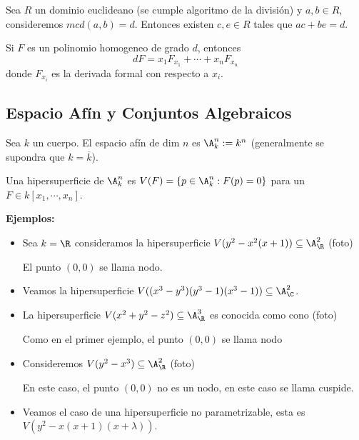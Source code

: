 \documentclass{article}
\begin{document}
\begin{teo}
    Sea $R$ un dominio euclideano (se cumple algoritmo de la división) y $a,b\in R$, consideremos
    $mcd(a,b)=d$. Entonces existen $c,e\in R$ tales que $ac+be=d$.
\end{teo}

\begin{teo}
    Si $F$ es un polinomio homogeneo de grado $d$, entonces
    \begin{equation*}
        dF=x_{1}F_{x_{1}}+\cdots+x_{n}F_{x_{n}}
    \end{equation*}
    donde $F_{x_{i}}$ es la derivada formal con respecto a $x_{i}$.
\end{teo}

\subsection{Espacio Afín y Conjuntos Algebraicos}
\begin{dfn}
Sea $k$ un cuerpo. El espacio afín de dim $n$ es $\A_{k}^{n}:=k^{n}$ (generalmente se supondra
que $k=\overline{k}$).
\end{dfn}

\begin{dfn}
    Una hipersuperficie de $\A_{k}^{n}$ es $V(F)=\{p\in\A_{k}^{n}:F(p)=0\}$ para un 
    $F\in k[x_{1},\cdots,x_{n}]$.
\end{dfn}

\noindent\textbf{Ejemplos:}
\begin{itemize}
    \item Sea $k=\R$ consideramos la hipersuperficie $V(y^{2}-x^{2}(x+1))\subseteq\A_{\R}^{2}$ 
    (foto)

    El punto $(0,0)$ se llama nodo.
    \item Veamos la hipersuperficie $V((x^{3}-y^{3})(y^{3}-1)(x^{3}-1))\subseteq\A_{\C}^{2}$.
    \item La hipersuperficie $V(x^{2}+y^{2}-z^{2})\subseteq\A_{\R}^{3}$ es conocida como cono
    (foto)

    Como en el primer ejemplo, el punto $(0,0)$ se llama nodo
    \item Consideremos $V(y^{2}-x^{3})\subseteq\A_{\R}^{2}$ (foto)
    
    En este caso, el punto $(0,0)$ no es un nodo, en este caso se llama cuspide.
    \item Veamos el caso de una hipersuperficie no parametrizable, esta es 
    $V(y^{2}-x(x+1)(x+\lambda))$.
\end{itemize}
\end{document}
